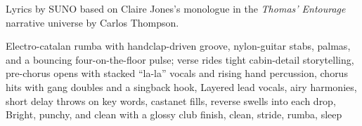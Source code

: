 
\begin{notes}
Lyrics by SUNO based on Claire Jones's monologue in the \emph{Thomas’ Entourage} narrative universe by Carlos Thompson.
\end{notes}
\begin{style}
Electro-catalan rumba with handclap-driven groove, nylon-guitar stabs, palmas, and a bouncing four-on-the-floor pulse; verse rides tight cabin-detail storytelling, pre-chorus opens with stacked “la-la” vocals and rising hand percussion, chorus hits with gang doubles and a singback hook, Layered lead vocals, airy harmonies, short delay throws on key words, castanet fills, reverse swells into each drop, Bright, punchy, and clean with a glossy club finish, clean, stride, rumba, sleep
\end{style}
